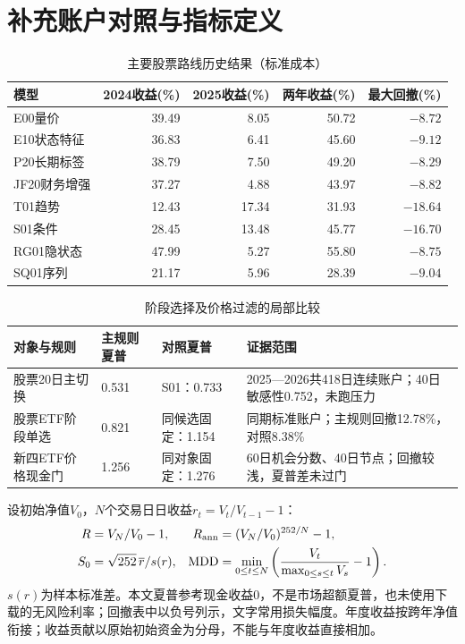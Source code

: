 \documentclass[11pt,a4paper]{article}
\newcommand{\note}[1]{\par\vspace{.1em}{\footnotesize\noindent 注：#1\par}}
\begin{document}
\clearpage
\section{补充账户对照与指标定义}
\begin{table}[htbp]\centering\small
\caption{主要股票路线历史结果（标准成本）}\label{tab:stock}
\begin{tabular}{@{}lrrrr@{}}\toprule
模型 & 2024收益(\%) & 2025收益(\%) & 两年收益(\%) & 最大回撤(\%) \\\midrule
E00量价 & 39.49 & 8.05 & 50.72 & $-8.72$ \\
E10状态特征 & 36.83 & 6.41 & 45.60 & $-9.12$ \\
P20长期标签 & 38.79 & 7.50 & 49.20 & $-8.29$ \\
JF20财务增强 & 37.27 & 4.88 & 43.97 & $-8.82$ \\
T01趋势 & 12.43 & 17.34 & 31.93 & $-18.64$ \\
S01条件 & 28.45 & 13.48 & 45.77 & $-16.70$ \\
RG01隐状态 & 47.99 & 5.27 & 55.80 & $-8.75$ \\
SQ01序列 & 21.17 & 5.96 & 28.39 & $-9.04$ \\
\bottomrule\end{tabular}
\note{2024—2025连续股票现金账户，与正文股票加三ETF账户不同。不同风险暴露下的收益差不是严格选股alpha。2026现金重启E00/T01/S01/E10/P20标准收益分别为$-4.31$/$-4.49$/$-1.86$/$-5.48$/$-3.16$\%。}
\end{table}

\begin{table}[htbp]\centering\small
\caption{阶段选择及价格过滤的局部比较}\label{tab:switch}
\begin{tabular}{@{}p{3.6cm}p{2.3cm}p{2.7cm}p{5.0cm}@{}}\toprule
对象与规则 & 主规则夏普 & 对照夏普 & 证据范围 \\\midrule
股票20日主切换 & 0.531 & S01：0.733 & 2025—2026共418日连续账户；40日敏感性0.752，未跑压力 \\
股票ETF阶段单选 & 0.821 & 同候选固定：1.154 & 同期标准账户；主规则回撤12.78\%，对照8.38\% \\
新四ETF价格现金门 & 1.256 & 同对象固定：1.276 & 60日机会分数、40日节点；回撤较浅，夏普差未过门 \\
\bottomrule\end{tabular}
\note{新四ETF以中证500、标普500、黄金、国债构成，不是正文的E00主动股票。上述连续2026年度段不能与本文175日现金重启结果混用。}
\end{table}

设初始净值$V_0$，$N$个交易日日收益$r_t=V_t/V_{t-1}-1$：
\begin{align}
 R &= V_N/V_0-1,& R_{\rm ann}&=(V_N/V_0)^{252/N}-1,\\
 S_0&=\sqrt{252}\,\overline r/s(r),&
 \mathrm{MDD}&=\min_{0\le t\le N}\left(\frac{V_t}{\max_{0\le s\le t}V_s}-1\right).
\end{align}
$s(r)$为样本标准差。本文夏普参考现金收益0，不是市场超额夏普，也未使用下载的无风险利率；回撤表中以负号列示，文字常用损失幅度。年度收益按跨年净值衔接；收益贡献以原始初始资金为分母，不能与年度收益直接相加。
\end{document}
